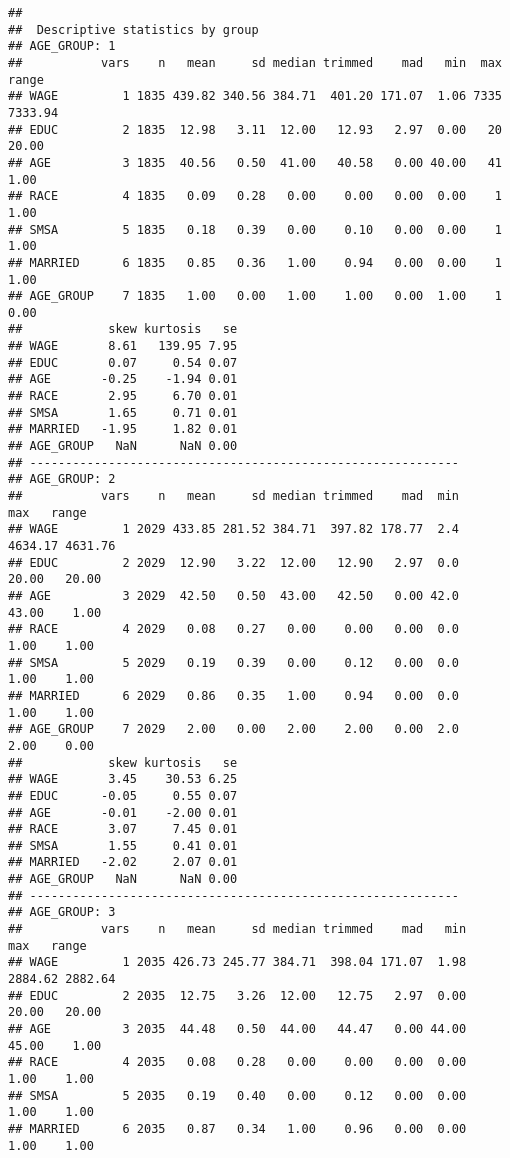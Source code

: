 \documentclass[
]{article}
\begin{document}
\begin{verbatim}
## 
##  Descriptive statistics by group 
## AGE_GROUP: 1
##           vars    n   mean     sd median trimmed    mad   min  max   range
## WAGE         1 1835 439.82 340.56 384.71  401.20 171.07  1.06 7335 7333.94
## EDUC         2 1835  12.98   3.11  12.00   12.93   2.97  0.00   20   20.00
## AGE          3 1835  40.56   0.50  41.00   40.58   0.00 40.00   41    1.00
## RACE         4 1835   0.09   0.28   0.00    0.00   0.00  0.00    1    1.00
## SMSA         5 1835   0.18   0.39   0.00    0.10   0.00  0.00    1    1.00
## MARRIED      6 1835   0.85   0.36   1.00    0.94   0.00  0.00    1    1.00
## AGE_GROUP    7 1835   1.00   0.00   1.00    1.00   0.00  1.00    1    0.00
##            skew kurtosis   se
## WAGE       8.61   139.95 7.95
## EDUC       0.07     0.54 0.07
## AGE       -0.25    -1.94 0.01
## RACE       2.95     6.70 0.01
## SMSA       1.65     0.71 0.01
## MARRIED   -1.95     1.82 0.01
## AGE_GROUP   NaN      NaN 0.00
## ------------------------------------------------------------ 
## AGE_GROUP: 2
##           vars    n   mean     sd median trimmed    mad  min     max   range
## WAGE         1 2029 433.85 281.52 384.71  397.82 178.77  2.4 4634.17 4631.76
## EDUC         2 2029  12.90   3.22  12.00   12.90   2.97  0.0   20.00   20.00
## AGE          3 2029  42.50   0.50  43.00   42.50   0.00 42.0   43.00    1.00
## RACE         4 2029   0.08   0.27   0.00    0.00   0.00  0.0    1.00    1.00
## SMSA         5 2029   0.19   0.39   0.00    0.12   0.00  0.0    1.00    1.00
## MARRIED      6 2029   0.86   0.35   1.00    0.94   0.00  0.0    1.00    1.00
## AGE_GROUP    7 2029   2.00   0.00   2.00    2.00   0.00  2.0    2.00    0.00
##            skew kurtosis   se
## WAGE       3.45    30.53 6.25
## EDUC      -0.05     0.55 0.07
## AGE       -0.01    -2.00 0.01
## RACE       3.07     7.45 0.01
## SMSA       1.55     0.41 0.01
## MARRIED   -2.02     2.07 0.01
## AGE_GROUP   NaN      NaN 0.00
## ------------------------------------------------------------ 
## AGE_GROUP: 3
##           vars    n   mean     sd median trimmed    mad   min     max   range
## WAGE         1 2035 426.73 245.77 384.71  398.04 171.07  1.98 2884.62 2882.64
## EDUC         2 2035  12.75   3.26  12.00   12.75   2.97  0.00   20.00   20.00
## AGE          3 2035  44.48   0.50  44.00   44.47   0.00 44.00   45.00    1.00
## RACE         4 2035   0.08   0.28   0.00    0.00   0.00  0.00    1.00    1.00
## SMSA         5 2035   0.19   0.40   0.00    0.12   0.00  0.00    1.00    1.00
## MARRIED      6 2035   0.87   0.34   1.00    0.96   0.00  0.00    1.00    1.00

\end{verbatim}
\end{document}
